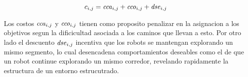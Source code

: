 \begin{equation} 
  c_{i,j} = \mathit{cca}_{i,j} + \mathit{cco}_{i,j} + \mathit{dse}_{i,j}
  \label{eq:costoTot}
\end{equation}

Los costos $\mathit{cca}_{i,j}$ y $\mathit{cco}_{i,j}$ tienen como proposito
penalizar en la asignacion a los objetivos segun la dificicultad asociada a los
caminos que llevan a esto. Por otro lado el descuento $\mathit{dse}_{i,j}$
incentiva que los robots se mantengan explorando un mismo segmento, lo cual
desencadena comportamientos deseables como el de que un robot continue
explorando un mismo corredor, revelando rapidamente la estructura de un entorno
estrucutrado.






